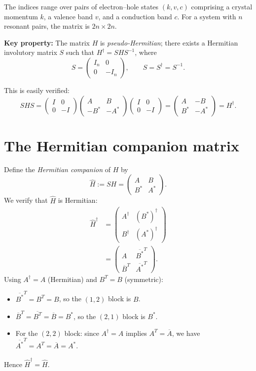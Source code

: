 \documentclass[11pt]{article}
\newcommand{\bmat}[1]{\begin{pmatrix}#1\end{pmatrix}}
\newcommand{\conj}[1]{\overline{#1}}
\newcommand{\hc}{\dagger}
\newcommand{\Hhat}{\widehat{H}}
\begin{document}
The indices range over pairs of electron--hole states $(k, v, c)$
comprising a crystal momentum $k$, a valence band $v$, and a
conduction band $c$. For a system with $n$ resonant pairs, the matrix
is $2n \times 2n$.

\medskip

\noindent\textbf{Key property:} The matrix $H$ is
\emph{pseudo-Hermitian}; there exists a Hermitian involutory matrix
$S$ such that $H^\hc = S H S^{-1}$, where
\begin{equation}\label{eq:S}
  S = \bmat{I_n & 0 \\ 0 & -I_n}, \qquad S = S^\hc = S^{-1}.
\end{equation}

This is easily verified:
\[
  SHS = \bmat{I & 0 \\ 0 & -I}\bmat{A & B \\ -B^* & -A^*}\bmat{I & 0 \\ 0 & -I}
  = \bmat{A & -B \\ B^* & -A^*} = H^\hc.
\]

\section{The Hermitian companion matrix}

Define the \emph{Hermitian companion} of $H$ by
\begin{equation}\label{eq:Hhat}
  \Hhat := S H = \bmat{A & B \\ B^* & A^*}.
\end{equation}
We verify that $\Hhat$ is Hermitian:
\begin{align*}
  \Hhat^\hc
  &= \bmat{A^\hc & (B^*)^\hc \\ B^\hc & (A^*)^\hc} \\
  &= \bmat{A & \conj{B^*}^T \\ \conj{B}^T & \conj{A^*}^T}.
\end{align*}
Using $A^\hc = A$ (Hermitian) and $B^T = B$ (symmetric):
\begin{itemize}
  \item $\conj{B^*}^T = B^T = B$, so the $(1,2)$ block is $B$. \checkmark
  \item $\conj{B}^T = \conj{B^T} = \conj{B} = B^*$, so the $(2,1)$
    block is $B^*$. \checkmark
  \item For the $(2,2)$ block: since $A^\hc = A$ implies $A^T = \conj{A}$,
    we have $\conj{A^*}^T = A^T = \conj{A} = A^*$. \checkmark
\end{itemize}
Hence $\Hhat^\hc = \Hhat$.
\end{document}
